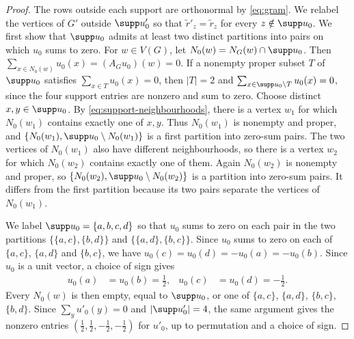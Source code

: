 \begin{proof}
  The rows outside each support are orthonormal by \cref{eq:gram}.
  We relabel the vertices of $G'$ outside $\supp u'_0$ so that
  $\tilde{r}'_z=\tilde{r}_z$ for every $z\notin\supp u_0$.
  We first show that $\supp u_0$ admits at least two distinct
  partitions into pairs on which $u_0$ sums to zero.
  For $w\in V(G)$, let $N_0(w)=N_G(w)\cap\supp u_0$.
  Then $\sum_{x\in N_0(w)}u_0(x)=(A_Gu_0)(w)=0$.
  If a nonempty proper subset $T$ of $\supp u_0$ satisfies
  $\sum_{x\in T}u_0(x)=0$, then $|T|=2$ and
  $\sum_{x\in\supp u_0\setminus T}u_0(x)=0$, since the four support
  entries are nonzero and sum to zero.
  Choose distinct $x,y\in\supp u_0$.
  By \cref{eq:support-neighbourhoods}, there is a vertex $w_1$ for which
  $N_0(w_1)$ contains exactly one of $x,y$.
  Thus $N_0(w_1)$ is nonempty and proper, and
  $\{N_0(w_1),\supp u_0\setminus N_0(w_1)\}$ is a first partition
  into zero-sum pairs.
  The two vertices of $N_0(w_1)$ also have different neighbourhoods,
  so there is a vertex $w_2$ for which $N_0(w_2)$ contains exactly
  one of them. Again $N_0(w_2)$ is nonempty and proper, so
  $\{N_0(w_2),\supp u_0\setminus N_0(w_2)\}$ is a partition into
  zero-sum pairs. It differs from the first partition because its
  two pairs separate the vertices of $N_0(w_1)$.

  We label $\supp u_0=\{a,b,c,d\}$ so that $u_0$ sums to zero
  on each pair in the two partitions
  $\{\{a,c\},\{b,d\}\}$ and $\{\{a,d\},\{b,c\}\}$.
  Since $u_0$ sums to zero on each of $\{a,c\}$, $\{a,d\}$ and
  $\{b,c\}$, we have
  $u_0(c)=u_0(d)=-u_0(a)=-u_0(b)$.
  Since $u_0$ is a unit vector, a choice of sign gives
  \begin{equation}
    \label{eq:support4}
    \begin{aligned}
      u_0(a)&=u_0(b)=\frac12, &
      u_0(c)&=u_0(d)=-\frac12.
    \end{aligned}
  \end{equation}
  Every $N_0(w)$ is then empty, equal to $\supp u_0$, or one of
  $\{a,c\}$, $\{a,d\}$, $\{b,c\}$, $\{b,d\}$.
  Since $\sum_yu'_0(y)=0$ and $|\supp u'_0|=4$, the same argument
  gives the nonzero entries $(\tfrac12,\tfrac12,-\tfrac12,-\tfrac12)$
  for $u'_0$, up to permutation and a choice of sign.


\end{proof}
